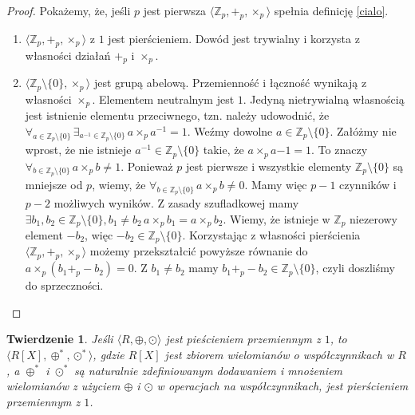 \documentclass[declaration,shortabstract]{iithesis}
\theoremstyle{definition}
\theoremstyle{remark} \newtheorem{observation}{Obserwacja}
\theoremstyle{plain} \newtheorem{theorem}{Twierdzenie}
\theoremstyle{plain} \newtheorem{lemma}{Lemat}
\theoremstyle{remark} \newtheorem*{remark*}{Uwaga}
\theoremstyle{reminder} \newtheorem*{reminder*}{Przypomnienie}
\begin{document}
\begin{proof}
    Pokażemy, że, jeśli $p$ jest pierwsza $\langle \mathbb{Z}_p, +_p, \times_p \rangle$ spełnia definicję \ref{cialo}.
    \begin{enumerate}[label=(\arabic*),leftmargin=.4in]
        \item $\langle \mathbb{Z}_p, +_p, \times_p \rangle$ z $1$ jest pierścieniem. Dowód jest trywialny i korzysta z własności działań $+_p$ i $\times_p$.
        \item $\langle \mathbb{Z}_p \setminus \{0\}, \times_p \rangle$ jest grupą abelową. Przemienność i łączność wynikają z własności $\times_p$. Elementem neutralnym jest $1$. Jedyną nietrywialną własnością jest istnienie elementu przeciwnego, tzn. należy udowodnić, że $\forall_{a \in \mathbb{Z}_p \setminus \{0\}} \, \exists_{a^{-1} \in \mathbb{Z}_p \setminus \{0\}} \, a \times_p a^{-1} = 1$.\newline
        Weźmy dowolne $a \in \mathbb{Z}_p \setminus \{0\}$. Załóżmy nie wprost, że nie istnieje $a^{-1} \in \mathbb{Z}_p \setminus \{0\}$ takie, że $a \times_p a{-1} = 1$. To znaczy $\forall_{b \in \mathbb{Z}_p \setminus \{0\}} \, a \times_p b \neq 1$. Ponieważ $p$ jest pierwsze i wszystkie elementy $\mathbb{Z}_p \setminus \{0\}$ są mniejsze od $p$, wiemy, że $\forall_{b \in \mathbb{Z}_p \setminus \{0\}} \, a \times_p b \neq 0$. Mamy więc $p-1$ czynników i $p-2$ możliwych wyników. Z zasady szufladkowej mamy $\exists{b_1, b_2 \in \mathbb{Z}_p \setminus \{0\}}, b_1 \neq b_2 \, a \times_p b_1 = a \times_p b_2$. Wiemy, że istnieje w $\mathbb{Z}_p$ niezerowy element $-b_2$, więc $-b_2 \in \mathbb{Z}_p \setminus \{0\}$. Korzystając z własności pierścienia $\langle \mathbb{Z}_p, +_p, \times_p \rangle$ możemy przekształcić powyższe równanie do $a \times_p (b_1 +_p -b_2) = 0$. Z $b_1 \neq b_2$ mamy $b_1 +_p -b_2 \in \mathbb{Z}_p \setminus \{0\}$, czyli doszliśmy do sprzeczności.
    \end{enumerate}
\end{proof}

\begin{theorem}
	Jeśli $\langle R, \oplus, \odot \rangle$ jest pieścieniem przemiennym z $1$, to $\langle R[X], \oplus^{*}, \odot^{*} \rangle$, gdzie $R[X]$ jest zbiorem wielomianów o współczynnikach w $R$, a $\oplus^*$ i $\odot^*$ są naturalnie zdefiniowanym dodawaniem i mnożeniem wielomianów z użyciem $\oplus$ i $\odot$ w operacjach na współczynnikach, jest pierścieniem przemiennym z $1$.
\end{theorem}
\end{document}
